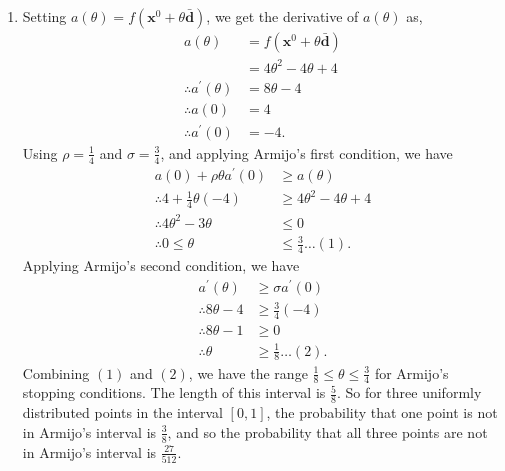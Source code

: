 \documentclass[a4paper,11pt]{article}
\newcommand{\ds}{\displaystyle}
\begin{document}
{{\begin{enumerate}[leftmargin=*]
\begin{enumerate}[label=\alph*)]
				\item Setting $\ds{a(\theta) = f\left(\mathbf{x}^0 + \theta\bar{\mathbf{d}}\right)}$, we get the derivative of $\ds{a(\theta)}$ as,
					\begin{align*}
						a(\theta) & = f\left(\mathbf{x}^0 + \theta\bar{\mathbf{d}}\right) \\
								  & = 4\theta^2 - 4\theta + 4 \\
						\therefore a^{\prime}(\theta) & = 8\theta - 4 \\
						\therefore a(0) & = 4 \\
						\therefore a^{\prime}(0) & = -4.
					\end{align*}
					Using $\ds{\rho = \frac{1}{4}}$ and $\ds{\sigma = \frac{3}{4}}$, and applying Armijo's first condition, we have
					\begin{align*}
						a(0) + \rho\theta a^{\prime}(0) & \geq a(\theta) \\
						\therefore 4 + \frac{1}{4}\theta(-4) & \geq 4\theta^2 - 4\theta + 4 \\
						\therefore 4\theta^2 - 3\theta & \leq 0 \\
						\therefore 0 \leq \theta & \leq \frac{3}{4} \dots (1).
					\end{align*}
					Applying Armijo's second condition, we have
					\begin{align*}
						a^{\prime}(\theta) & \geq  \sigma a^{\prime}(0) \\
						\therefore 8\theta - 4 & \geq \frac{3}{4}(-4) \\
						\therefore 8\theta - 1 & \geq 0 \\
						\therefore \theta & \geq \frac{1}{8} \dots (2).
					\end{align*}
					Combining $\ds{(1)}$ and $\ds{(2)}$, we have the range $\ds{\frac{1}{8} \leq \theta \leq \frac{3}{4}}$ for Armijo's stopping conditions. The length of this interval is $\ds{\frac{5}{8}}$. So for three uniformly distributed points in the interval $\ds{[0,1]}$, the probability that one point is not in Armijo's interval is $\ds{\frac{3}{8}}$, and so the probability that all three points are not in Armijo's interval is $\ds{\frac{27}{512}}$.
			\end{enumerate}


\end{enumerate}}}
\end{document}
